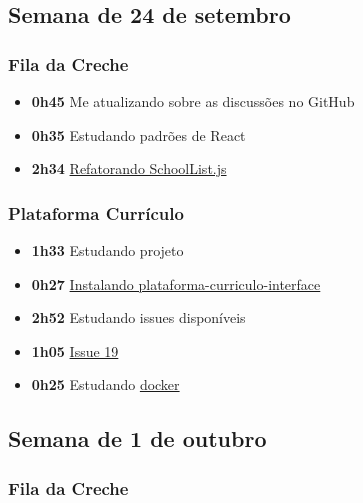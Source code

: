 \hypertarget{semana-de-24-de-setembro}{%
\subsection{Semana de 24 de setembro}\label{semana-de-24-de-setembro}}

\hypertarget{fila-da-creche-1}{%
\subsubsection{Fila da Creche}\label{fila-da-creche-1}}

\begin{itemize}
\tightlist
\item
  \textbf{0h45} Me atualizando sobre as discussões no GitHub
\item
  \textbf{0h35} Estudando padrões de React
\item
  \textbf{2h34}
  \href{https://github.com/prefeiturasp/SME-FilaDaCreche/pull/51}{Refatorando
  SchoolList.js}
\end{itemize}

\hypertarget{plataforma-curruxedculo}{%
\subsubsection{Plataforma Currículo}\label{plataforma-curruxedculo}}

\begin{itemize}
\tightlist
\item
  \textbf{1h33} Estudando projeto
\item
  \textbf{0h27}
  \href{https://github.com/prefeiturasp/SME-plataforma-curriculo-interface}{Instalando
  plataforma-curriculo-interface}
\item
  \textbf{2h52} Estudando issues disponíveis
\item
  \textbf{1h05}
  \href{https://github.com/prefeiturasp/SME-plataforma-curriculo/issues/19}{Issue
  19}
\item
  \textbf{0h25} Estudando \href{http://docker.com/}{docker}
\end{itemize}

\hypertarget{semana-de-1-de-outubro}{%
\subsection{Semana de 1 de outubro}\label{semana-de-1-de-outubro}}

\hypertarget{fila-da-creche-2}{%
\subsubsection{Fila da Creche}\label{fila-da-creche-2}}


